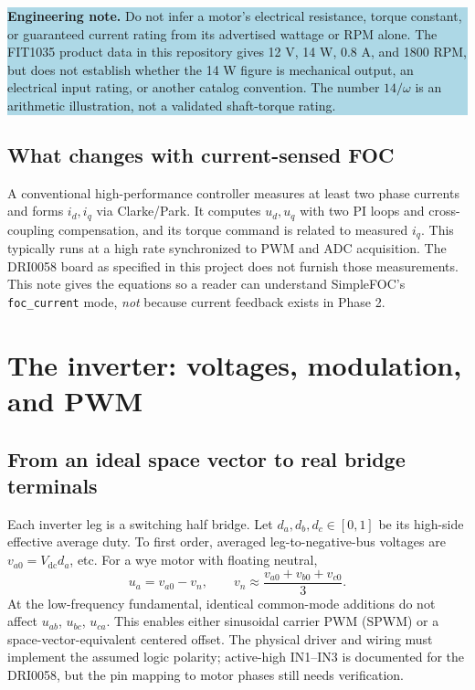 \documentclass[10pt,letterpaper]{article}
\newcommand{\Vdc}{V_{\mathrm{dc}}}
\newcommand{\note}[1]{\par\medskip\noindent\colorbox{lightblue}{\parbox{0.965\linewidth}{\textbf{Engineering note.} #1}}\par\medskip}
\begin{document}
\note{Do not infer a motor's electrical resistance, torque constant, or guaranteed current rating from its advertised wattage or RPM alone. The FIT1035 product data in this repository gives 12 V, 14 W, 0.8 A, and 1800 RPM, but does not establish whether the 14 W figure is mechanical output, an electrical input rating, or another catalog convention. The number $14/\omega$ is an arithmetic illustration, not a validated shaft-torque rating.}

\subsection{What changes with current-sensed FOC}
A conventional high-performance controller measures at least two phase currents and forms $i_d,i_q$ via Clarke/Park. It computes $u_d,u_q$ with two PI loops and cross-coupling compensation, and its torque command is related to measured $i_q$. This typically runs at a high rate synchronized to PWM and ADC acquisition. The DRI0058 board as specified in this project does not furnish those measurements. This note gives the equations so a reader can understand SimpleFOC's \texttt{foc\_current} mode, \emph{not} because current feedback exists in Phase 2.

\section{The inverter: voltages, modulation, and PWM}
\subsection{From an ideal space vector to real bridge terminals}
Each inverter leg is a switching half bridge. Let $d_a,d_b,d_c\in[0,1]$ be its high-side effective average duty. To first order, averaged leg-to-negative-bus voltages are $v_{a0}=\Vdc d_a$, etc. For a wye motor with floating neutral,
\begin{equation}\label{eq:terminal}
u_a=v_{a0}-v_n,\qquad v_n\approx \frac{v_{a0}+v_{b0}+v_{c0}}3.
\end{equation}
At the low-frequency fundamental, identical common-mode additions do not affect $u_{ab}$, $u_{bc}$, $u_{ca}$. This enables either sinusoidal carrier PWM (SPWM) or a space-vector-equivalent centered offset. The physical driver and wiring must implement the assumed logic polarity; active-high IN1--IN3 is documented for the DRI0058, but the pin mapping to motor phases still needs verification.
\end{document}
